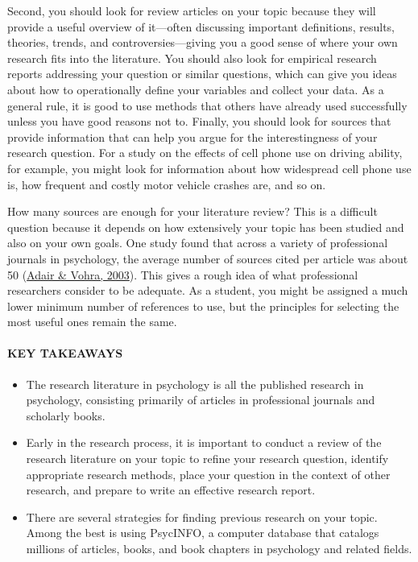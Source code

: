 \documentclass[
]{krantz}
\providecommand{\tightlist}{%
  \setlength{\itemsep}{0pt}\setlength{\parskip}{0pt}}
\begin{document}
Second, you should look for review articles on your topic because they will provide a useful overview of it---often discussing important definitions, results, theories, trends, and controversies---giving you a good sense of where your own research fits into the literature. You should also look for empirical research reports addressing your question or similar questions, which can give you ideas about how to operationally define your variables and collect your data. As a general rule, it is good to use methods that others have already used successfully unless you have good reasons not to. Finally, you should look for sources that provide information that can help you argue for the interestingness of your research question. For a study on the effects of cell phone use on driving ability, for example, you might look for information about how widespread cell phone use is, how frequent and costly motor vehicle crashes are, and so on.

How many sources are enough for your literature review? This is a difficult question because it depends on how extensively your topic has been studied and also on your own goals. One study found that across a variety of professional journals in psychology, the average number of sources cited per article was about 50 (\protect\hyperlink{ref-adair2003explosion}{Adair \& Vohra, 2003}). This gives a rough idea of what professional researchers consider to be adequate. As a student, you might be assigned a much lower minimum number of references to use, but the principles for selecting the most useful ones remain the same.

\hypertarget{key-takeaways-30}{%
\paragraph*{KEY TAKEAWAYS}\label{key-takeaways-30}}

\begin{itemize}
\tightlist
\item
  The research literature in psychology is all the published research in psychology, consisting primarily of articles in professional journals and scholarly books.
\item
  Early in the research process, it is important to conduct a review of the research literature on your topic to refine your research question, identify appropriate research methods, place your question in the context of other research, and prepare to write an effective research report.
\item
  There are several strategies for finding previous research on your topic. Among the best is using PsycINFO, a computer database that catalogs millions of articles, books, and book chapters in psychology and related fields.
\end{itemize}
\end{document}
